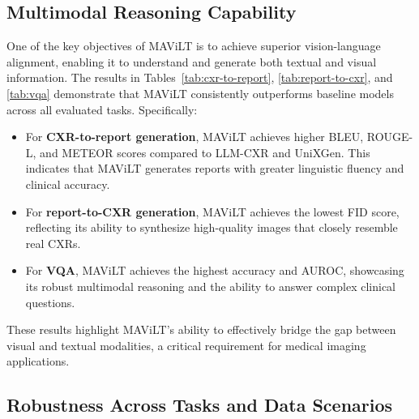 \subsection{Multimodal Reasoning Capability}

One of the key objectives of MAViLT is to achieve superior vision-language alignment, enabling it to understand and generate both textual and visual information. The results in Tables~\ref{tab:cxr-to-report}, \ref{tab:report-to-cxr}, and \ref{tab:vqa} demonstrate that MAViLT consistently outperforms baseline models across all evaluated tasks. Specifically:
\begin{itemize}
    \item For \textbf{CXR-to-report generation}, MAViLT achieves higher BLEU, ROUGE-L, and METEOR scores compared to LLM-CXR and UniXGen. This indicates that MAViLT generates reports with greater linguistic fluency and clinical accuracy.
    \item For \textbf{report-to-CXR generation}, MAViLT achieves the lowest FID score, reflecting its ability to synthesize high-quality images that closely resemble real CXRs.
    \item For \textbf{VQA}, MAViLT achieves the highest accuracy and AUROC, showcasing its robust multimodal reasoning and the ability to answer complex clinical questions.
\end{itemize}
These results highlight MAViLT’s ability to effectively bridge the gap between visual and textual modalities, a critical requirement for medical imaging applications.

\subsection{Robustness Across Tasks and Data Scenarios}

